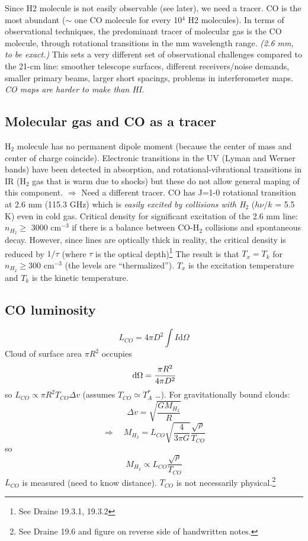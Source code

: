 \documentclass[11pt]{article}
\newcommand{\mar}[1]{\hspace{0pt}\marginpar{-\textcolor{black}{#1}-}}
\newcommand{\mynotes}[1]{{\fontfamily{cmss}\selectfont \textit{#1}}}
\begin{document}
Since H2 molecule is not
easily observable (see later), we need a tracer. CO is the most abundant
($\sim$ one CO molecule for every 10$^{4}$ H2 molecules). In terms of
observational techniques, the predominant tracer of molecular gas is the
CO molecule, through rotational transitions in the mm wavelength range.
\mynotes{(2.6 mm, to be exact.)}
This sets a very different set of observational challenges compared to the
21-cm line: smoother telescope surfaces, different receivers/noise demands,
smaller primary beams, larger short spacings, problems in interferometer
maps. \mynotes{CO maps are harder to make than HI.}

\subsection{Molecular gas and CO as a tracer}
\mar{128}H$_{2}$ molecule has no permanent dipole moment (because the
center of mass and center of charge coincide). Electronic transitions in the
UV (Lyman and Werner bands) have been detected in absorption, and
rotational-vibrational transitions in IR (H$_{2}$ gas that is warm due to shocks)
but these do not allow general maping of this component.
$\Rightarrow$ Need a different tracer. CO has J=1-0 rotational transition
at 2.6 mm (115.3 GHz) which is \emph{easily excited by collisions with
H$_{2}$} ($h\nu/k$ = 5.5 K) even in cold gas. Critical density for
significant excitation of the 2.6 mm line:
$n_{H_{2}} \geq$ 3000 cm$^{-3}$ if there is a balance between CO-H$_{2}$
collisions and spontaneous decay. However, since lines are optically thick
in reality, the critical density is reduced by $1/\tau$ (where $\tau$ is the
optical depth)\footnote{
    See Draine 19.3.1, 19.3.2}
The result is that $T_{x} = T_{k}$ for $n_{H_{2}} \geq 300$ cm$^{-3}$
(the levels are ``thermalized''). $T_{x}$ is the excitation temperature and
$T_{k}$ is the kinetic temperature.

\subsection{CO luminosity}
\mar{130}
\[
    L_{CO} = 4{\pi}D^{2} \int{ I \mathrm{d}\Omega }
    \]
Cloud of surface area ${\pi}R^{2}$ occupies
\[
    \mathrm{d}\Omega = \cfrac{{\pi}R^{2}}{4{\pi}D^{2}}
    \]
so $L_{CO} \propto {\pi}R^{2} T_{CO} {\Delta}v$
(assumes $T_{CO} \simeq T_{A}^{*}$ \ldots).
For gravitationally bound clouds:
\[
    {\Delta}v = \sqrt{ \frac{GM_{H_{2}}}{R} }
    \]
\[
    \Longrightarrow \quad
    M_{H_{2}} = L_{CO} \sqrt{ \frac{4}{3{\pi}G} } \frac{\sqrt{\rho}}{T_{CO}}
    \]
so
\[
    M_{H_{2}} \propto L_{CO} \frac{\sqrt{\rho}}{T_{CO}}
    \]
$L_{CO}$ is measured (need to know distance). $T_{CO}$ is not necessarily
physical.\footnote{
    See Draine 19.6 and figure on reverse side of handwritten notes.}
\end{document}
